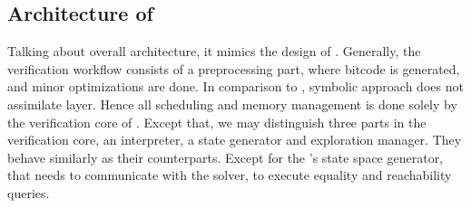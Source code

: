 \subsection{Architecture of \SymDIVINE}
Talking about \SymDIVINE overall architecture, it mimics the design of \DIVINE.
Generally, the verification workflow consists of a preprocessing part, where
\LLVM bitcode is generated, and minor optimizations are done. In comparison to
\DIVINE, symbolic approach does not assimilate \DIOS layer. Hence all scheduling
and memory management is done solely by the verification core of \SymDIVINE. Except
that, we may distinguish three parts in the verification core, an interpreter, a state
generator and exploration manager. They behave similarly as their \DIVINE
counterparts. Except for the \SymDIVINE's state space generator, that needs to
communicate with the \SMT solver, to execute equality and reachability queries.

